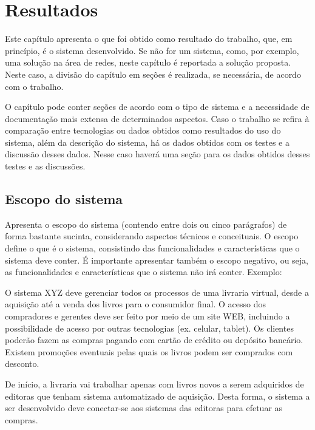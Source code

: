 
\chapter{Resultados}\label{cap:resultados}

Este capítulo apresenta o que foi obtido como resultado do trabalho, que, em princípio, é o sistema desenvolvido. Se não for um sistema, como, por exemplo, uma solução na área de redes, neste capítulo é reportada a solução proposta. Neste caso, a divisão do capítulo em seções é realizada, se necessária, de acordo com o trabalho.

O capítulo pode conter seções de acordo com o tipo de sistema e a necessidade de documentação mais extensa de determinados aspectos. Caso o trabalho se refira à comparação entre tecnologias ou dados obtidos como resultados do uso do sistema, além da descrição do sistema, há os dados obtidos com os testes e a discussão desses dados. Nesse caso haverá uma seção para os dados obtidos desses testes e as discussões.

\section{Escopo do sistema}\label{sec:escopoSistema}

Apresenta o escopo do sistema (contendo entre dois ou cinco parágrafos) de forma bastante sucinta, considerando aspectos técnicos e conceituais. O escopo define o que é o sistema, consistindo das funcionalidades e características que o sistema deve conter. É importante apresentar também o escopo negativo, ou seja, as funcionalidades e características que o sistema não irá conter.
Exemplo:

O sistema XYZ deve gerenciar todos os processos de uma livraria virtual, desde a aquisição até a venda dos livros para o consumidor final. O acesso dos compradores e gerentes deve ser feito por meio de um site WEB, incluindo a possibilidade de acesso por outras tecnologias (ex. celular, tablet). Os clientes poderão fazem as compras pagando com cartão de crédito ou depósito bancário. Existem promoções eventuais pelas quais os livros podem ser comprados com desconto.

De início, a livraria vai trabalhar apenas com livros novos a serem adquiridos de editoras que tenham sistema automatizado de aquisição. Desta forma, o sistema a ser desenvolvido deve conectar-se aos sistemas das editoras para efetuar as compras.

